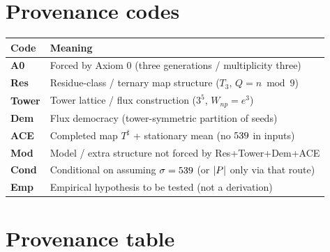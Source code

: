 {\section{Provenance codes}

\begin{center}
\begin{tabular}{@{}lp{}@{}}
\toprule
Code & Meaning \\
\midrule
\textbf{A0} & Forced by Axiom 0 (three generations / multiplicity three) \\
\textbf{Res} & Residue-class / ternary map structure (\(T_3\), \(Q=n\bmod 9\)) \\
\textbf{Tower} & Tower lattice / flux construction (\(3^5\), \(W_{np}=e^3\)) \\
\textbf{Dem} & Flux democracy (tower-symmetric partition of seeds) \\
\textbf{ACE} & Completed map \(T^\sharp\) + stationary mean (no \(539\) in inputs) \\
\textbf{Mod} & Model / extra structure not forced by Res+Tower+Dem+ACE \\
\textbf{Cond} & Conditional on assuming \(\sigma=539\) (or \(|P|\) only via that route) \\
\textbf{Emp} & Empirical hypothesis to be tested (not a derivation) \\
\bottomrule
\end{tabular}
\end{center}

\section{Provenance table}
\label{sec:provenance-table}

}
